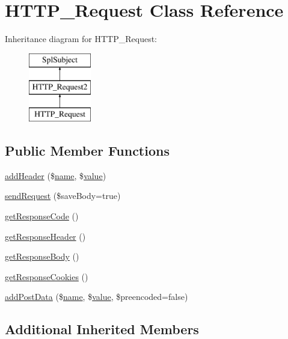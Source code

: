 \hypertarget{classHTTP__Request}{}\section{H\+T\+T\+P\+\_\+\+Request Class Reference}
\label{classHTTP__Request}
Inheritance diagram for H\+T\+T\+P\+\_\+\+Request\+:\begin{figure}[H]
\begin{center}
\leavevmode
\includegraphics[height=3.000000cm]{classHTTP__Request}
\end{center}
\end{figure}
\subsection*{Public Member Functions}
\begin{DoxyCompactItemize}
\item 
\hyperlink{classHTTP__Request_ad7ce4b414109089320151442d1aa23d3}{add\+Header} (\$\hyperlink{common_8js_a22c29d2aa8ed6161ce8faa718ef76e68}{name}, \$\hyperlink{jquery_8js_abe5393d870043cf6aaa1d5ad5fce755c}{value})
\item 
\hyperlink{classHTTP__Request_af3e8b1423f6a2858652063c4a6f697a0}{send\+Request} (\$save\+Body=true)
\item 
\hyperlink{classHTTP__Request_adca0e2580505791e5ad42f7737568ade}{get\+Response\+Code} ()
\item 
\hyperlink{classHTTP__Request_a821d6c29dea6073a0d7f5e414d1237a6}{get\+Response\+Header} ()
\item 
\hyperlink{classHTTP__Request_a8cf9237fc5a74cc2d797b64b7823db08}{get\+Response\+Body} ()
\item 
\hyperlink{classHTTP__Request_a5fc2cc22a0652620d6866994397f5418}{get\+Response\+Cookies} ()
\item 
\hyperlink{classHTTP__Request_a3b856946e8c0ccc2c84dac7c7e93bd9d}{add\+Post\+Data} (\$\hyperlink{common_8js_a22c29d2aa8ed6161ce8faa718ef76e68}{name}, \$\hyperlink{jquery_8js_abe5393d870043cf6aaa1d5ad5fce755c}{value}, \$preencoded=false)
\end{DoxyCompactItemize}
\subsection*{Additional Inherited Members}


